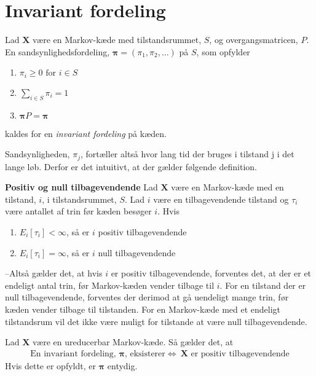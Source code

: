 \section{Invariant fordeling}

\begin{defn}\textbf{} %
\newline \label{defn: invariant_fordeling}
Lad $\bm X$ være en Markov-kæde med tilstandsrummet, $S$, og overgangsmatricen, $P$. En sandsynlighedsfordeling, $\bm\pi=(\pi_1,\pi_2,\dots)$ på $S$, som opfylder
\begin{enumerate}
    \item $\pi_i\geq 0 \text{ for } i\in S$
    \item $\displaystyle\sum_{i\in S} \pi_i=1$
    \item $\bm\pi P=\bm\pi$
\end{enumerate}
kaldes for en \textit{invariant fordeling} på kæden. 
\end{defn}

Sandsynligheden, $\pi_j$, fortæller altså hvor lang tid der bruges i tilstand j i det lange løb. Derfor er det intuitivt, at der gælder følgende definition.

\begin{defn}\textbf{Positiv og null tilbagevendende} %
\newline
Lad $\bm X$ være en Markov-kæde med en tilstand, $i$, i tilstandsrummet, $S$. Lad $i$ være en tilbagevendende tilstand og $\tau_i$ være antallet af trin før kæden besøger $i$. Hvis
\begin{enumerate}
    \item $E_i[\tau_i]<\infty$, så er $i$ positiv tilbagevendende
    \item $E_i[\tau_i]=\infty$, så er $i$ null tilbagevendende
\end{enumerate}
\end{defn}

--Altså gælder det, at hvis $i$ er positiv tilbagevendende, forventes det, at der er et endeligt antal trin, før Markov-kæden vender tilbage til $i$. For en tilstand der er null tilbagevendende, forventes der derimod at gå uendeligt mange trin, før kæden vender tilbage til tilstanden. For en Markov-kæde med et endeligt tilstandsrum vil det ikke være muligt for tilstande at være null tilbagevendende. 

\begin{minipage}\textwidth
\begin{thmx} \textbf{} %
\newline
Lad $\bm X$ være en ureducerbar Markov-kæde. Så gælder det, at 
\begin{align*}
    \text{En invariant fordeling, } \bm \pi \text{, eksisterer} \Leftrightarrow \ \bm X \text{ er positiv tilbagevendende}
\end{align*}
Hvis dette er opfyldt, er $\bm\pi$ entydig. 
\end{thmx}
\end{minipage}

